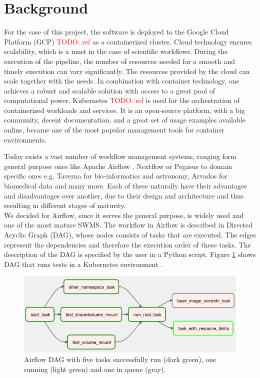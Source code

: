\documentclass[lettersize,journal]{IEEEtran}
\newcommand{\todo}[1]{\textcolor{red}{TODO: #1}\PackageWarning{TODO:}{#1!}}
\begin{document}
	\section{Background}
	For the case of this project, the software is deployed to the Google Cloud Platform (GCP) \todo{ref} as a containerized cluster. Cloud technology ensures scalability, which is a must in the case of scientific workflows. During the execution of the pipeline, the number of resources needed for a smooth and timely execution can vary significantly. The resources provided by the cloud can scale together with the needs. In combination with container technology, one achieves a robust and scalable solution with access to a great pool of computational power. Kubernetes \todo{ref} is used for the orchestration of containerized workloads and services. It is an open-source platform, with a big community, decent documentation, and a great set of usage examples available online, became one of the most popular management tools for container environments.  
	
	Today exists a vast number of workflow management systems, ranging form general purpose ones like Apache Airflow \cite{airflow}, Nextflow \cite{nextflow} or Pegasus \cite{pegasus} to domain specific ones e.g. Taverna \cite{taverna} for bio-informatics and astronomy, Arvados \cite{arvados} for biomedical data and many more. Each of these naturally have their advantages and disadvantages over another, due to their design and architecture and thus resulting in different stages of maturity.\\
	We decided for Airflow, since it serves the general purpose, is widely used and one of the most mature SWMS. The workflow in Airflow is described in Directed Acyclic Graph (DAG), whose nodes consists of tasks that are executed. The edges represent the dependencies and therefore the execution order of these tasks. The description of the DAG is specified by the user in a Python script. Figure \ref{fig:aiflow:dag} shows DAG that runs tests in a Kubernetes environment \cite{airflowDag}.
	\begin{figure}[h]
		\includegraphics[width=\linewidth]{images/airflow-dag.png}
		\caption{Airflow DAG with five tasks successfully run (dark green), one running (light green) and one in queue (gray).}
		\label{fig:aiflow:dag}
	\end{figure}
	
\end{document}
